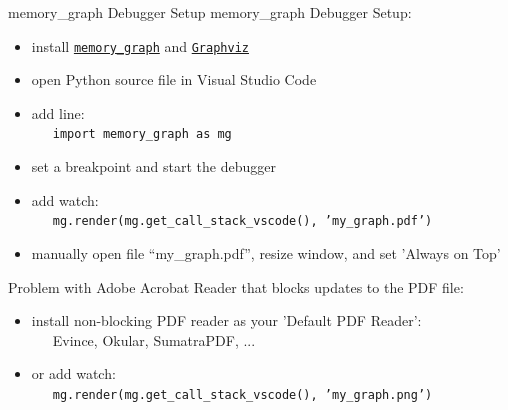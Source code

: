\documentclass[10pt, colorlinks=true, urlcolor=blue]{beamer}
\begin{document}
\begin{frame}{memory\_graph Debugger Setup}
  \vspace{-1em}
  memory\_graph Debugger Setup:
  \begin{itemize}
  \item install \href{https://pypi.org/project/memory-graph/}{\texttt{memory\_graph}} and \href{https://graphviz.org/download/}{\texttt{Graphviz}}
  \item open Python source file in Visual Studio Code
  \item add line: \\ \ \ \ {\footnotesize \texttt{import memory_graph as mg}}
  \item set a breakpoint and start the debugger
  \item add watch: \\ \ \ \ {\footnotesize \texttt{mg.render(mg.get_call_stack_vscode(), 'my_graph.pdf')}}
  \item manually open file ``my\_graph.pdf'', resize window,  and set 'Always on Top'
  \end{itemize}
  
  \vspace{2em}
  
  Problem with Adobe Acrobat Reader that blocks updates to the PDF file:
  \begin{itemize}
  \item install non-blocking PDF reader as your 'Default PDF Reader': \\ \ \ \ Evince, Okular, SumatraPDF, ...
  \item or add watch: \\ \ \ \ {\footnotesize \texttt{mg.render(mg.get_call_stack_vscode(), 'my_graph.png')}}
  \end{itemize}
\end{frame}
\end{document}
